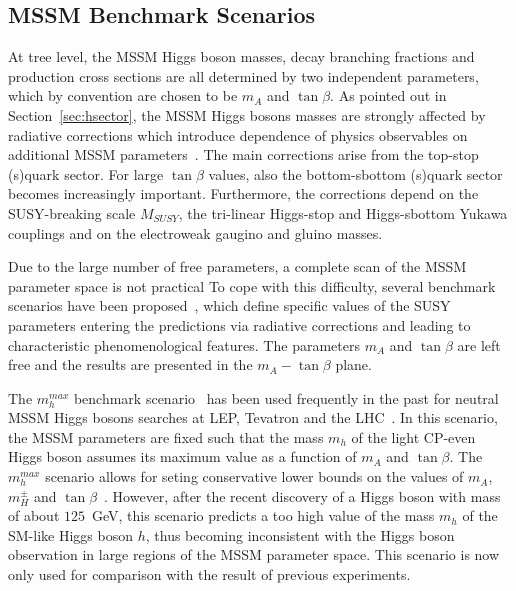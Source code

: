 \subsection{MSSM Benchmark Scenarios} \label{sec:benchmark}
At tree level, the MSSM  Higgs boson masses, decay branching fractions and production cross sections are all determined by two independent parameters,
which by convention are chosen to be $m_A$ and $\tan\beta$. As pointed out in Section~\ref{sec:hsector}, 
the MSSM Higgs bosons masses are strongly affected by radiative corrections which introduce dependence  of physics observables 
on additional MSSM parameters~\cite{Higgsm5}.
The main corrections arise from the top-stop (s)quark sector. For large $\tan\beta$ values, also the bottom-sbottom (s)quark sector becomes increasingly 
important. Furthermore, the corrections  depend on the SUSY-breaking scale $M_{SUSY}$, the tri-linear Higgs-stop and  
Higgs-sbottom Yukawa couplings and on the electroweak gaugino and gluino masses.

Due to the large number of free parameters, a complete scan of the MSSM parameter space is not practical 
To cope with this difficulty, several benchmark scenarios have been proposed~\cite{LHCxsec,mhmax2}, which define 
specific values of the SUSY parameters entering the predictions via radiative corrections
and leading to characteristic phenomenological features.
The parameters $m_A$ and $\tan\beta$ are left free and the results are presented in the $m_A-\tan\beta$ plane.

The $m_h^{max}$ benchmark scenario~\cite{MSSMmhmax} has been used  frequently  in the past for neutral MSSM Higgs bosons searches
at LEP, Tevatron and the LHC~\cite{LEPLimits,TevatronLimits1,CMSLimit,ATLASLimit}. In this 
scenario, the MSSM parameters  are fixed such that the mass  $m_h$ of the light CP-even Higgs boson
assumes its maximum value as a function of $m_A$ and $\tan\beta$. The $m_h^{max}$ scenario allows for seting conservative 
lower bounds on the values of $m_A$, $m_H^{\pm}$ and $\tan\beta$~\cite{mhmax2}. However, after the recent discovery of a Higgs
boson with mass of about $125$~GeV, this scenario
predicts a too high value of the mass $m_h$ of the SM-like Higgs boson $h$, 
thus becoming inconsistent with the Higgs boson observation in large regions of the MSSM parameter space.
This scenario is now only  used  for  comparison with the result of previous experiments.

